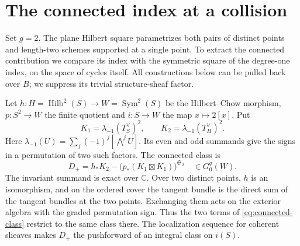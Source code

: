 \section{The connected index at a collision}\label{sec:collision}

Set $g=2$. The plane Hilbert square parametrizes both pairs of distinct
points and length-two schemes supported at a single point. To extract the
connected contribution we compare its index with the symmetric square
of the degree-one index, on the space of cycles itself. All constructions below can be pulled back
over $B$; we suppress its trivial structure-sheaf factor.

Let $h:H=\operatorname{Hilb}^2(S)\to W=\operatorname{Sym}^2(S)$ be
the Hilbert--Chow morphism, $p:S^2\to W$ the finite quotient and
$i:S\to W$ the map $x\mapsto 2[x]$. Put
\begin{equation}
 K_1=\lambda_{-1}(T_S^\vee)^2,\qquad
 K_2=\lambda_{-1}(T_H^\vee)^2 .
\end{equation}
Here $\lambda_{-1}(U)=\sum_j(-1)^j[\bigwedge^j U]$. Its even and odd
summands give the signs in a permutation of two such factors. The
connected class is
\begin{equation}
 D_+=h_*K_2-\bigl(p_*(K_1\boxtimes K_1)\bigr)^{\mathfrak S_2}
                    \quad\in G_0^q(W).
 \label{eq:connected-class}
\end{equation}
The invariant summand is exact over $\mathbb C$. Over two distinct points,
$h$ is an isomorphism, and on the ordered cover the tangent bundle is the
direct sum of the tangent bundles at the two points. Exchanging them acts
on the exterior algebra with the graded permutation sign. Thus the two
terms of \eqref{eq:connected-class} restrict to the same class there.
The localization sequence for coherent sheaves makes $D_+$ the pushforward
of an integral class on $i(S)$.

